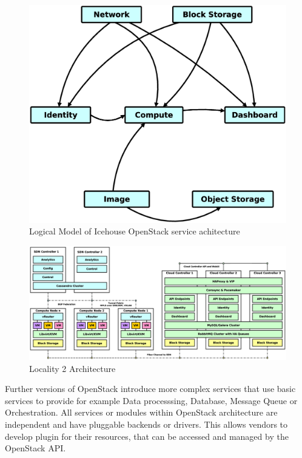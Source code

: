 \begin{figure}[h]
\centering
\includegraphics[scale=.13]{img/openstack_logical_model.eps}
\caption{Logical Model of Icehouse OpenStack service achitecture}
\label{fig:moduls}
\end{figure}

\begin{figure}[!h]
\centering
\includegraphics[scale=.15]{img/use_case_ha_sdn.eps}
\caption{Locality 2 Architecture}
\label{fig:pisek}
\end{figure}


Further versions of OpenStack introduce more complex services that use basic services to provide for example Data processsing, Database, Message Queue  or Orchestration. All services or modules within OpenStack architecture are independent and have pluggable backends or drivers. This allows vendors to develop plugin for their resources, that can be accessed and managed by the OpenStack API.

